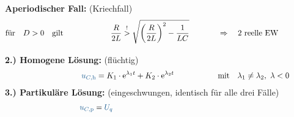 \begin{frame}[t]
{\textbf{Aperiodischer Fall:} (Kriechfall)%
}%
\ifvmode\vspace*{-\baselineskip}\setlength{\parskip}{4pt}\fi%
\begin{align*}%
    &\text{für}\quad D > 0 \quad\text{gilt}&
        &\phantom{\mathrel{\phantom{=}}-}\frac{R}{2L} \overset{!}{>} \sqrt{\left(\frac{R}{2L}\right)^2 - \frac{1}{LC}}
            &&\Rightarrow\quad \text{2 reelle EW}
    \\[-10pt] &\hphantom{1rrrrrrrrrrrrrrrr} &   \hphantom{2llllll}&\hphantom{\mathrel{\phantom{=}}2rrrrrrrrrrrrrrrrrrrrrrrrrrr}     &&\hphantom{3rrrrrrrrrrrrrrrrrrrrrrrr} \nonumber
\end{align*}%
\pause%
\textbf{2.) Homogene Lösung:} (flüchtig)
\begin{align}%
    &&
        \ecv{u_{C,\mathrm{h}}} &= K_1 \cdot \mathrm{e}^{\lambda_1 t} + K_2 \cdot \mathrm{e}^{\lambda_2 t}
            &&\text{mit}\quad \lambda_1 \neq \lambda_2,\ \lambda <  0  \label{eq:dgl:rlc:homolsg:aperiodisch}
    \\[-15pt] &\hphantom{1rrrrrrrrrrrrrrrr} &   \hphantom{2llllll}&\hphantom{\mathrel{\phantom{=}}2rrrrrrrrrrrrrrrrrrrrrrrrrrr}     &&\hphantom{3rrrrrrrrrrrrrrrrrrrrrrrr} \nonumber
\end{align}%
%
\textbf{3.) Partikuläre Lösung:} (eingeschwungen, identisch für alle drei Fälle)%
\begin{align*}
    &&
        \ecv{u_{C,\mathrm{p}}} &= \ecv{U_q}
        \\[-15pt] &\hphantom{1rrrrrrrrrrrrrrrr} &   \hphantom{2llllll}&\hphantom{\mathrel{\phantom{=}}2rrrrrrrrrrrrrrrrrrrrrrrrrrr}     &&\hphantom{3rrrrrrrrrrrrrrrrrrrrrrrr} \nonumber
    \end{align*}%
\end{frame}%
